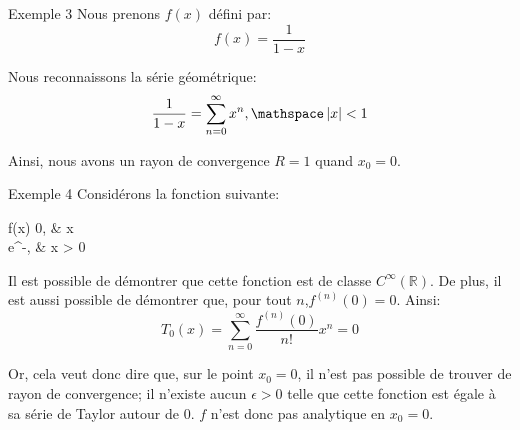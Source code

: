 \documentclass[a4paper]{article}
\begin{document}
\begin{parag}{Exemple 3}
    Nous prenons $f\left(x\right)$ défini par: 
    \[f\left(x\right) = \frac{1}{1-x}\]
    
    Nous reconnaissons la série géométrique: 
    \[\frac{1}{1-x} = \sum_{n=0}^{\infty} x^n, \mathspace \left|x\right| < 1\]

    Ainsi, nous avons un rayon de convergence $R = 1$ quand $x_0 = 0$.
\end{parag}

\begin{parag}{Exemple 4}
    Considérons la fonction suivante:
    \begin{functionbypart}{f\left(x\right)}
        0, &  x  \\
        e^{-}, &  x > 0
    \end{functionbypart}

    Il est possible de démontrer que cette fonction est de classe $C^\infty \left(\mathbb{R}\right)$. De plus, il est aussi possible de démontrer que, pour tout $n$,$f^{\left(n\right)}\left(0\right) = 0$. Ainsi:
    \[T_0\left(x\right) = \sum_{n=0}^{\infty} \frac{f^{\left(n\right)}\left(0\right)}{n!} x^n = 0\]
    
    Or, cela veut donc dire que, sur le point $x_0 = 0$, il n'est pas possible de trouver de rayon de convergence; il n'existe aucun $\epsilon > 0$ telle que cette fonction est égale à sa série de Taylor autour de 0. $f$ n'est donc pas analytique en $x_0 = 0$.
\end{parag}
\end{document}
